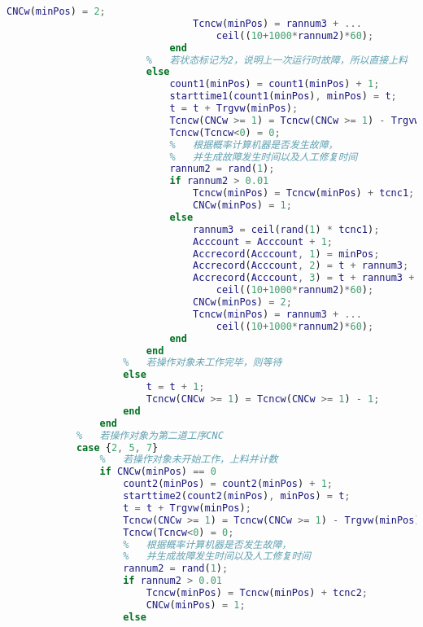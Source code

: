 \documentclass[no-math,withoutpreface,bwprint]{cumcmthesis} %
\numberwithin{equation}{section}
\numberwithin{figure}{section}
\numberwithin{table}{section}
\begin{document}
\begin{lstlisting}[language=matlab]
                                CNCw(minPos) = 2;
                                Tcncw(minPos) = rannum3 + ...
                                    ceil((10+1000*rannum2)*60);
                            end
                        %   若状态标记为2，说明上一次运行时故障，所以直接上料
                        else
                            count1(minPos) = count1(minPos) + 1;
                            starttime1(count1(minPos), minPos) = t;
                            t = t + Trgvw(minPos);
                            Tcncw(CNCw >= 1) = Tcncw(CNCw >= 1) - Trgvw(minPos);
                            Tcncw(Tcncw<0) = 0;
                            %   根据概率计算机器是否发生故障，
                            %   并生成故障发生时间以及人工修复时间
                            rannum2 = rand(1);
                            if rannum2 > 0.01
                                Tcncw(minPos) = Tcncw(minPos) + tcnc1;
                                CNCw(minPos) = 1;
                            else
                                rannum3 = ceil(rand(1) * tcnc1);
                                Acccount = Acccount + 1;
                                Accrecord(Acccount, 1) = minPos;
                                Accrecord(Acccount, 2) = t + rannum3;
                                Accrecord(Acccount, 3) = t + rannum3 + ...
                                    ceil((10+1000*rannum2)*60);
                                CNCw(minPos) = 2;
                                Tcncw(minPos) = rannum3 + ...
                                    ceil((10+1000*rannum2)*60);
                            end
                        end
                    %   若操作对象未工作完毕，则等待
                    else
                        t = t + 1;
                        Tcncw(CNCw >= 1) = Tcncw(CNCw >= 1) - 1;
                    end
                end
            %   若操作对象为第二道工序CNC
            case {2, 5, 7}
                %   若操作对象未开始工作，上料并计数
                if CNCw(minPos) == 0
                    count2(minPos) = count2(minPos) + 1;
                    starttime2(count2(minPos), minPos) = t;
                    t = t + Trgvw(minPos);
                    Tcncw(CNCw >= 1) = Tcncw(CNCw >= 1) - Trgvw(minPos);
                    Tcncw(Tcncw<0) = 0;
                    %   根据概率计算机器是否发生故障，
                    %   并生成故障发生时间以及人工修复时间
                    rannum2 = rand(1);
                    if rannum2 > 0.01
                        Tcncw(minPos) = Tcncw(minPos) + tcnc2;
                        CNCw(minPos) = 1;
                    else

\end{lstlisting}
\end{document}
